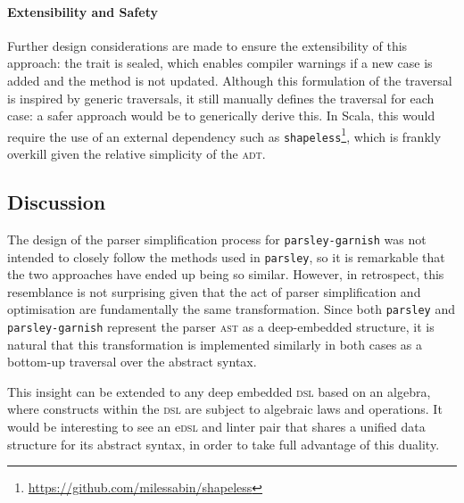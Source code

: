 \documentclass[../../../main.tex]{subfiles}
\begin{document}
\paragraph{Extensibility and Safety}
Further design considerations are made to ensure the extensibility of this approach: the  trait is sealed, which enables compiler warnings if a new  case is added and the  method is not updated.
Although this formulation of the traversal is inspired by generic traversals, it still manually defines the traversal for each case: a safer approach would be to generically derive this.
In Scala, this would require the use of an external dependency such as \texttt{shapeless}\footnote{\url{https://github.com/milessabin/shapeless}},
which is frankly overkill given the relative simplicity of the  \textsc{adt}.

\subsection{Discussion}
The design of the parser simplification process for \texttt{parsley-garnish} was not intended to closely follow the methods used in \texttt{parsley}, so it is remarkable that the two approaches have ended up being so similar.
However, in retrospect, this resemblance is not surprising given that the act of parser simplification and optimisation are fundamentally the same transformation.
Since both \texttt{parsley} and \texttt{parsley-garnish} represent the parser \textsc{ast} as a deep-embedded structure, it is natural that this transformation is implemented similarly in both cases as a bottom-up traversal over the abstract syntax.

This insight can be extended to any deep embedded \textsc{dsl} based on an algebra, where constructs within the \textsc{dsl} are subject to algebraic laws and operations.
It would be interesting to see an e\textsc{dsl} and linter pair that shares a unified data structure for its abstract syntax, in order to take full advantage of this duality.
\end{document}
